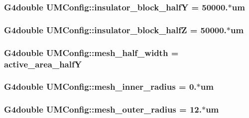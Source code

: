 \subsubsection[{insulator\+\_\+block\+\_\+half\+Y}]{\setlength{\rightskip}{0pt plus 5cm}G4double U\+M\+Config\+::insulator\+\_\+block\+\_\+half\+Y = 50000.$\ast$um}\label{structUMConfig_a41c70da919e44de22920f7b1704790ca}
\hypertarget{structUMConfig_ac37bdc75ee79cf798d480466ad3fde13}{}
\subsubsection[{insulator\+\_\+block\+\_\+half\+Z}]{\setlength{\rightskip}{0pt plus 5cm}G4double U\+M\+Config\+::insulator\+\_\+block\+\_\+half\+Z = 50000.$\ast$um}\label{structUMConfig_ac37bdc75ee79cf798d480466ad3fde13}
\hypertarget{structUMConfig_ad589fe0f446c4d020ddf0c009fe0314a}{}
\subsubsection[{mesh\+\_\+half\+\_\+width}]{\setlength{\rightskip}{0pt plus 5cm}G4double U\+M\+Config\+::mesh\+\_\+half\+\_\+width = {\bf active\+\_\+area\+\_\+half\+Y}}\label{structUMConfig_ad589fe0f446c4d020ddf0c009fe0314a}
\hypertarget{structUMConfig_a779b130ea0412d60509556a1342071a5}{}
\subsubsection[{mesh\+\_\+inner\+\_\+radius}]{\setlength{\rightskip}{0pt plus 5cm}G4double U\+M\+Config\+::mesh\+\_\+inner\+\_\+radius = 0.$\ast$um}\label{structUMConfig_a779b130ea0412d60509556a1342071a5}
\hypertarget{structUMConfig_a3ae6c3881d3bc76057e8fe9ffbdeaf66}{}
\subsubsection[{mesh\+\_\+outer\+\_\+radius}]{\setlength{\rightskip}{0pt plus 5cm}G4double U\+M\+Config\+::mesh\+\_\+outer\+\_\+radius = 12.$\ast$um}\label{structUMConfig_a3ae6c3881d3bc76057e8fe9ffbdeaf66}
\hypertarget{structUMConfig_a01eccb4b99640dc0d93bf74496c1184e}{}
